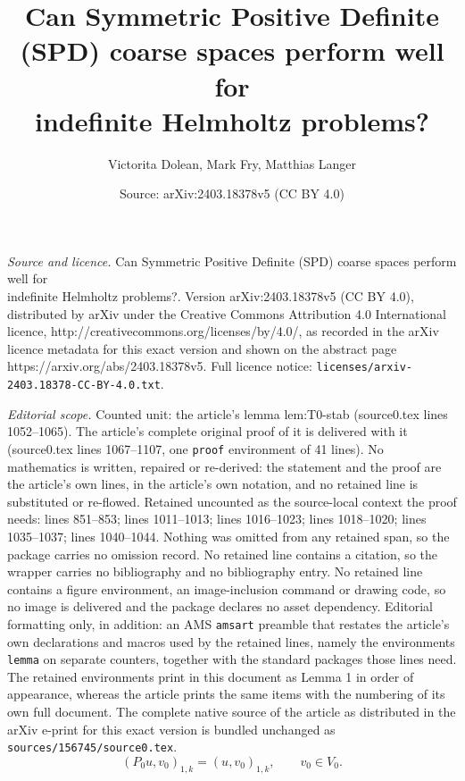\documentclass[10pt,a4paper]{amsart}
\title{Can Symmetric Positive Definite (SPD) coarse spaces perform well for \\ indefinite Helmholtz problems?}
\author{Victorita Dolean, Mark Fry, Matthias Langer}
\date{Source: arXiv:2403.18378v5 (CC BY 4.0)}
\begin{document}
\maketitle

\noindent\emph{Source and licence.} Can Symmetric Positive Definite (SPD) coarse spaces perform well for \\ indefinite Helmholtz problems?. Version arXiv:2403.18378v5 (CC BY 4.0), distributed by arXiv under the Creative Commons Attribution 4.0 International licence, http://creativecommons.org/licenses/by/4.0/, as recorded in the arXiv licence metadata for this exact version and shown on the abstract page https://arxiv.org/abs/2403.18378v5. Full licence notice: \texttt{licenses/arxiv-2403.18378-CC-BY-4.0.txt}.\par\smallskip

\noindent\textit{Editorial scope.} Counted unit: the article's lemma lem:T0-stab (source0.tex lines 1052--1065). The article's complete original proof of it is delivered with it (source0.tex lines 1067--1107, one \texttt{proof} environment of 41 lines). No mathematics is written, repaired or re-derived: the statement and the proof are the article's own lines, in the article's own notation, and no retained line is substituted or re-flowed.  Retained uncounted as the source-local context the proof needs: lines 851--853; lines 1011--1013; lines 1016--1023; lines 1018--1020; lines 1035--1037; lines 1040--1044.  Nothing was omitted from any retained span, so the package carries no omission record.  No retained line contains a citation, so the wrapper carries no bibliography and no bibliography entry.  No retained line contains a figure environment, an image-inclusion command or drawing code, so no image is delivered and the package declares no asset dependency.  Editorial formatting only, in addition: an AMS \texttt{amsart} preamble that restates the article's own declarations and macros used by the retained lines, namely the environments \texttt{lemma} on separate counters, together with the standard packages those lines need.  The retained environments print in this document as Lemma 1 in order of appearance, whereas the article prints the same items with the numbering of its own full document.  The complete native source of the article as distributed in the arXiv e-print for this exact version is bundled unchanged as \texttt{sources/156745/source0.tex}.
\begin{equation}\label{eq:proj_ritz_coarse}
	(P_0 u, v_0)_{1, k} = (u,v_0)_{1, k}, \qquad v_0\in V_0 .
\end{equation}
\end{document}
